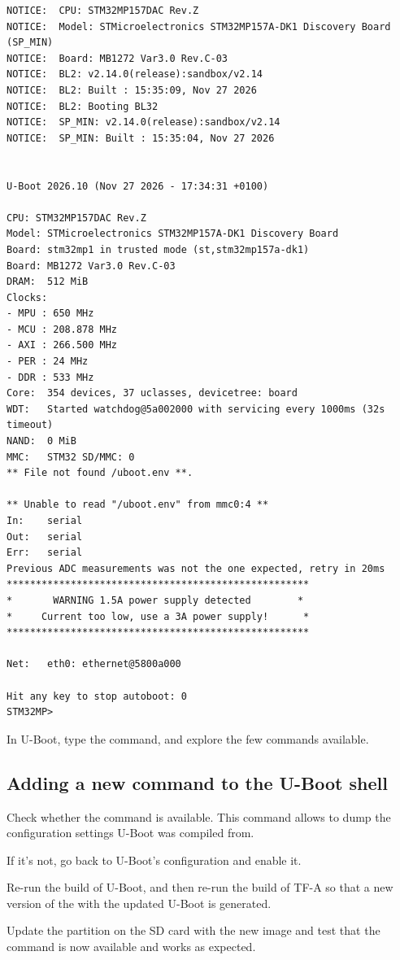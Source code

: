 \begin{verbatim}
NOTICE:  CPU: STM32MP157DAC Rev.Z
NOTICE:  Model: STMicroelectronics STM32MP157A-DK1 Discovery Board (SP_MIN)
NOTICE:  Board: MB1272 Var3.0 Rev.C-03
NOTICE:  BL2: v2.14.0(release):sandbox/v2.14
NOTICE:  BL2: Built : 15:35:09, Nov 27 2026
NOTICE:  BL2: Booting BL32
NOTICE:  SP_MIN: v2.14.0(release):sandbox/v2.14
NOTICE:  SP_MIN: Built : 15:35:04, Nov 27 2026


U-Boot 2026.10 (Nov 27 2026 - 17:34:31 +0100)

CPU: STM32MP157DAC Rev.Z
Model: STMicroelectronics STM32MP157A-DK1 Discovery Board
Board: stm32mp1 in trusted mode (st,stm32mp157a-dk1)
Board: MB1272 Var3.0 Rev.C-03
DRAM:  512 MiB
Clocks:
- MPU : 650 MHz
- MCU : 208.878 MHz
- AXI : 266.500 MHz
- PER : 24 MHz
- DDR : 533 MHz
Core:  354 devices, 37 uclasses, devicetree: board
WDT:   Started watchdog@5a002000 with servicing every 1000ms (32s timeout)
NAND:  0 MiB
MMC:   STM32 SD/MMC: 0
** File not found /uboot.env **.

** Unable to read "/uboot.env" from mmc0:4 **
In:    serial
Out:   serial
Err:   serial
Previous ADC measurements was not the one expected, retry in 20ms
****************************************************
*       WARNING 1.5A power supply detected        *
*     Current too low, use a 3A power supply!      *
****************************************************

Net:   eth0: ethernet@5800a000

Hit any key to stop autoboot: 0
STM32MP>
\end{verbatim}

In U-Boot, type the  command, and explore the few commands
available.

\subsection{Adding a new command to the U-Boot shell}

Check whether the  command is available. This command
allows to dump the configuration settings U-Boot was compiled from.

If it's not, go back to U-Boot's configuration and enable it.

Re-run the build of U-Boot, and then re-run the build of TF-A so that
a new version of the  with the updated U-Boot is
generated.

Update the  partition on the SD card with the new
 image and test that the command is now available and
works as expected.

